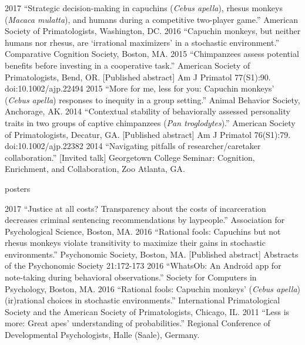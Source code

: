 \documentclass[]{friggeri-cv}
\begin{document}
\begin{entrylist2}
  \entrytwo
    {2017}
    {``Strategic decision-making in capuchins (\emph{Cebus apella}), rhesus monkeys (\emph{Macaca mulatta}), and humans during a competitive two-player game.'' American Society of Primatologists, Washington, DC.}
  \entrytwo
    {2016}
    {``Capuchin monkeys, but neither humans nor rhesus, are `irrational maximizers' in a stochastic environment.'' Comparative Cognition Society, Boston, MA.}
  \entrytwo
    {2015}
    {``Chimpanzees assess potential benefits before investing in a cooperative task.'' American Society of Primatologists, Bend, OR. [Published abstract] Am J Primatol 77(S1):90. doi:10.1002/ajp.22494}
  \entrytwo
    {2015}
    {``More for me, less for you: Capuchin monkeys' (\emph{Cebus apella}) responses to inequity in a group setting.'' Animal Behavior Society, Anchorage, AK.}
  \entrytwo
    {2014}
    {``Contextual stability of behaviorally assessed personality traits in two groups of captive chimpanzees (\emph{Pan troglodytes}).'' American Society of Primatologists, Decatur, GA. [Published abstract] Am J Primatol 76(S1):79. doi:10.1002/ajp.22382}
  \entrytwo
    {2014}
    {``Navigating pitfalls of researcher/caretaker collaboration.'' [Invited talk] Georgetown College Seminar: Cognition, Enrichment, and Collaboration, Zoo Atlanta, GA.}
\end{entrylist2}


{\subfont\large{} posters}

\begin{entrylist2}
  \entrytwo
    {2017}
    {``Justice at all costs? Transparency about the costs of incarceration decreases criminal sentencing recommendations by laypeople.'' Association for Psychological Science, Boston, MA.}
  \entrytwo
    {2016}
    {``Rational fools: Capuchins but not rhesus monkeys violate transitivity to maximize their gains in stochastic environments.'' Psychonomic Society, Boston, MA. [Published abstract] Abstracts of the Psychonomic Society 21:172-173}
  \entrytwo
    {2016}
    {``WhatsOb: An Android app for note-taking during behavioral observations.'' Society for Computers in Psychology, Boston, MA.}
  \entrytwo
    {2016}
    {``Rational fools: Capuchin monkeys' (\emph{Cebus apella}) (ir)rational choices in stochastic environments.'' International Primatological Society and the American Society of Primatologists, Chicago, IL.}
  \entrytwo
    {2011}
    {``Less is more: Great apes' understanding of probabilities.'' Regional Conference of Developmental Psychologists, Halle (Saale), Germany.}
\end{entrylist2}
\end{document}
